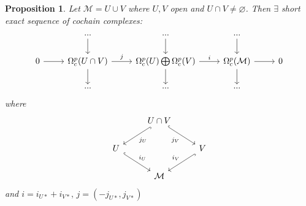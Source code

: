 \documentclass[10pt]{article}
\theoremstyle{plain}
\newtheorem{prop}[thm]{Proposition}
\theoremstyle{definition}
\newcommand{\man}{\mathcal{M}}
\begin{document}
\begin{prop}
Let $\man = U \cup V$ where $U,V$ open and $U\cap V \neq \varnothing$. Then $\exists$ short exact sequence of cochain complexes:
$$%
\begin{tikzcd}
            & ... \arrow[d]                                & ... \arrow[d]                                                  & ... \arrow[d]                               &   \\
0 \arrow[r] & \Omega_c^p(U\cap V) \arrow[r, "j"] \arrow[d] & \Omega_c^p(U) \bigoplus \Omega_c^p(V) \arrow[r, "i"] \arrow[d] & \Omega_c^p(\mathcal{M}) \arrow[r] \arrow[d] & 0 \\
            & ...                                          & ...                                                            & ...                                         &  
\end{tikzcd}$$
where 
$$%
\begin{tikzcd}
                          & U\cap V \arrow[rd, "j_V"', hook] \arrow[ld, "j_U", hook] &                            \\
U \arrow[rd, "i_U", hook] &                                                          & V \arrow[ld, "i_V"', hook] \\
                          & \mathcal{M}                                              &                           
\end{tikzcd}$$
and $i = i_{U*} + i_{V*}, \, j= (-j_{U*},j_{V*})$
\end{prop}
\end{document}
